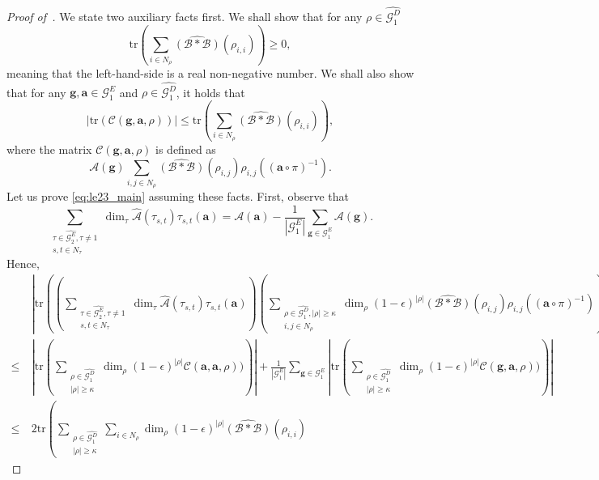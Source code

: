 \documentclass[a4paper,11pt]{article}
\theoremstyle{definition}
\newcommand{\tuple}[1]{{\mathbf{#1}}}
\newcommand{\gr}{\mathscr{G}}
\newcommand{\ba}{\mathbf{a}}
\newcommand{\tr}{\mathrm{tr}}
\newcommand{\A}{\mathcal{A}}
\newcommand{\B}{\mathcal{B}}
\begin{document}
\begin{proof}[Proof of~]
We state two auxiliary facts first. We shall show that for any $\rho\in \widehat{\gr_1^D}$
\begin{equation}
    \label{eq:le23_aux0}
    \tr\left(
\sum_{i\in N_\rho}
\widehat{(\B*\B)}(\rho_{i,i})
\right) \geq 0,
\end{equation}
meaning that the left-hand-side is a real non-negative number. 
We shall also show that for any $\tuple{g},\ba \in \gr_1^{E}$ and $\rho\in \widehat{\gr_1^D}$, it holds that
\begin{equation}
\label{eq:le23_aux1}
\left\vert \tr
\left(
\mathcal{C}(\tuple{g},\tuple{a},\rho)
\right)
\right\vert \leq 
\tr\left(
\sum_{i\in N_\rho}
\widehat{(\B*\B)}(\rho_{i,i})
\right),
\end{equation}
where the matrix $\mathcal{C}(\tuple{g},\tuple{a},\rho)$ is defined as 
\[\A(\tuple{g})
\sum_{i,j\in N_\rho}
\widehat{(\B*\B)}(\rho_{i,j})\rho_{i,j}((\ba\circ\pi)^{-1}).\]
Let us prove \eqref{eq:le23_main} assuming these facts. First, observe that
\[
\sum_{\substack{\tau\in \widehat{\gr_2^E}, \tau\neq 1\\
s,t\in N_\tau
}}
\dim_\tau
\widehat{\A}(\tau_{s,t}) \tau_{s,t}(\tuple{a}) = 
\A(\tuple{a}) - \frac{1}{|\gr_1^E|} \sum_{\tuple{g}\in \gr_1^E} \A(\tuple{g}).
\]
Hence,
\begin{align*}
     & 
    \left| 
    \tr \left(
    \left( \sum_{\substack{\tau\in \widehat{\gr_2^E}, \tau\neq 1\\
s,t\in N_\tau
}}
\dim_\tau
\widehat{\A}(\tau_{s,t}) \tau_{s,t}(\tuple{a}) \right)
\left(
\sum_{\substack{\rho \in \widehat{\gr_1^D}, |\rho| \geq \kappa\\ i,j \in N_\rho}} \dim_\rho (1-\epsilon)^{|\rho|} \widehat{(\B*\B)}(\rho_{i,j}) \rho_{i,j}( (\tuple{a} \circ \pi)^{-1})  \right) \right) \right|  \\
 \leq \ &
\left|
\tr\left(
\sum_{\substack{\rho \in \widehat{\gr_1^D}\\ |\rho| \geq \kappa}}
\dim_\rho (1-\epsilon)^{|\rho|}
\mathcal{C}(\tuple{a},\tuple{a},\rho))
\right)
\right| + 
\frac{1}{|\gr_1^E|}
\sum_{\tuple{g}\in \gr_1^E}
\left|
\tr\left(
\sum_{\substack{\rho \in \widehat{\gr_1^D}\\ |\rho| \geq \kappa}}
\dim_\rho (1-\epsilon)^{|\rho|}
\mathcal{C}(\tuple{g},\tuple{a},\rho))
\right)
\right|  
 \\ \leq \ &
2 \tr \left(
\sum_{\substack{\rho \in \widehat{\gr_1^D}\\ |\rho| \geq \kappa}}
\sum_{i\in N_\rho} \dim_\rho (1-\epsilon)^{|\rho|} \widehat{(\B*\B)}(\rho_{i,i})

\end{align*}
\end{proof}
\end{document}
